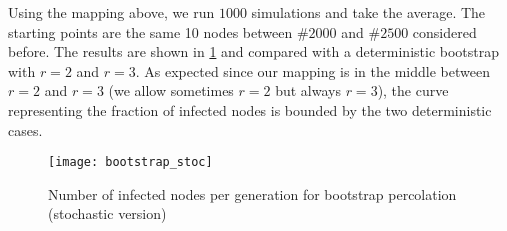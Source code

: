 Using the mapping above, we run $1000$ simulations and take the average. The starting points are the same 10 nodes between $\#2000$ and $\#2500$ considered before. The results are shown in \cref{fig:2_boot_stoc} and compared with a deterministic bootstrap with $r=2$ and $r=3$. As expected since our mapping is in the middle between $r=2$ and $r=3$ (we allow sometimes $r=2$ but always $r=3$), the curve representing the fraction of infected nodes is bounded by the two deterministic cases.

\begin{figure} [!ht]
	\centering
	\texttt{[image: bootstrap\_stoc]}
	\caption{Number of infected nodes per generation for bootstrap percolation (stochastic version)}
	\label{fig:2_boot_stoc}
\end{figure}
